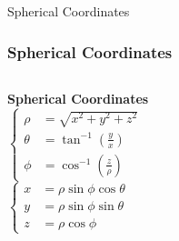 \documentclass[aspectratio=169, UTF8]{beamer}
\begin{document}
\begin{frame}{Spherical Coordinates}
    \frametitle{Spherical Coordinates}
    \begin{columns}
        \begin{column}{0.3\textwidth}
            \textbf{Spherical Coordinates} \\
            $
                \begin{cases}
                    \rho   & = \sqrt{x^2 + y^2 + z^2}               \\
                    \theta & = \tan^{-1}\left(\frac{y}{x}\right)    \\
                    \phi   & = \cos^{-1}\left(\frac{z}{\rho}\right)
                \end{cases}
            $
            \\
            $
                \begin{cases}
                    x & = \rho\sin\phi\cos\theta \\
                    y & = \rho\sin\phi\sin\theta \\
                    z & = \rho\cos\phi
                \end{cases}
            $
        \end{column}


\end{columns}
\end{frame}
\end{document}
